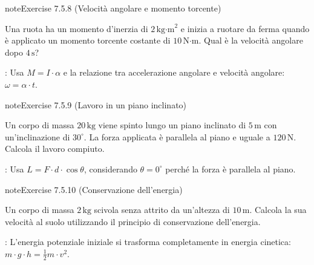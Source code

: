 \documentclass[letterpaper,10pt,italian]{jupyterBook}
\begin{document}
\begin{sphinxadmonition}{note}{Exercise 7.5.8 (Velocità angolare e momento torcente)}



\sphinxAtStartPar
Una ruota ha un momento d’inerzia di \(2 \, \text{kg·m}^2\) e inizia a ruotare da ferma quando è applicato un momento torcente costante di \(10 \, \text{N·m}\). Qual è la velocità angolare dopo \(4 \, \text{s}\)?

\sphinxAtStartPar
{}: Usa \( M = I \cdot \alpha \) e la relazione tra accelerazione angolare e velocità angolare: \( \omega = \alpha \cdot t \).
\end{sphinxadmonition}
 \label{exercise:ch/mechanics/actions-problems-exercise-8}

\begin{sphinxadmonition}{note}{Exercise 7.5.9 (Lavoro in un piano inclinato)}



\sphinxAtStartPar
Un corpo di massa \(20 \, \text{kg}\) viene spinto lungo un piano inclinato di \(5 \, \text{m}\) con un’inclinazione di \(30^\circ\). La forza applicata è parallela al piano e uguale a \(120 \, \text{N}\). Calcola il lavoro compiuto.

\sphinxAtStartPar
{}: Usa \( L = F \cdot d \cdot \cos\theta \), considerando \(\theta = 0^\circ\) perché la forza è parallela al piano.
\end{sphinxadmonition}
 \label{exercise:ch/mechanics/actions-problems-exercise-9}

\begin{sphinxadmonition}{note}{Exercise 7.5.10 (Conservazione dell’energia)}



\sphinxAtStartPar
Un corpo di massa \(2 \, \text{kg}\) scivola senza attrito da un’altezza di \(10 \, \text{m}\). Calcola la sua velocità al suolo utilizzando il principio di conservazione dell’energia.

\sphinxAtStartPar
{}: L’energia potenziale iniziale si trasforma completamente in energia cinetica: \( m \cdot g \cdot h = \frac{1}{2} m \cdot v^2 \).
\end{sphinxadmonition}

\sphinxstepscope
\end{document}
